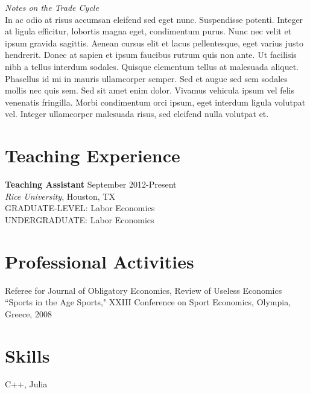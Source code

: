 \documentclass{article}[12]
\newcommand{\forceindent}{\leavevmode{\parindent=24pt\indent}}
\begin{document}
\vspace{6pt} %

\emph{Notes on the Trade Cycle}      \hfill   \\
In ac odio at risus accumsan eleifend sed eget nunc. Suspendisse potenti. Integer at ligula efficitur, lobortis magna eget, condimentum purus. Nunc nec velit et ipsum gravida sagittis. Aenean cursus elit et lacus pellentesque, eget varius justo hendrerit. Donec at sapien et ipsum faucibus rutrum quis non ante. Ut facilisis nibh a tellus interdum sodales. Quisque elementum tellus at malesuada aliquet. Phasellus id mi in mauris ullamcorper semper. Sed et augue sed sem sodales mollis nec quis sem. Sed sit amet enim dolor. Vivamus vehicula ipsum vel felis venenatis fringilla. Morbi condimentum orci ipsum, eget interdum ligula volutpat vel. Integer ullamcorper malesuada risus, sed eleifend nulla volutpat et. 


\section{Teaching Experience}

\textbf{Teaching Assistant} \hfill     September 2012-Present \\
\forceindent \emph{Rice University}, Houston, TX              \\
\forceindent GRADUATE-LEVEL: Labor Economics                  \\
\forceindent UNDERGRADUATE: Labor Economics


\section{Professional Activities}

Referee for Journal of Obligatory Economics, Review of Useless Economics \\
``Sports in the Age Sports," XXIII Conference on Sport Economics, Olympia, Greece, 2008


\section{Skills}

C++, Julia
\end{document}
